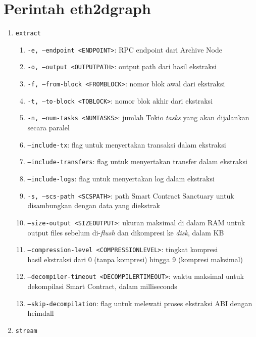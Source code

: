 \chapter{Perintah eth2dgraph}
\label{appendix:eth2dgraph-commands}

\begin{enumerate}
	\item \texttt{extract}
	      \begin{enumerate}
		      \item \texttt{-e, --endpoint <ENDPOINT>}: RPC endpoint dari Archive Node
		      \item \texttt{-o, --output <OUTPUT\textunderscore PATH>}: output path dari hasil ekstraksi
		      \item \texttt{-f, --from-block <FROM\textunderscore BLOCK>}: nomor blok awal dari ekstraksi
		      \item \texttt{-t, --to-block <TO\textunderscore BLOCK>}: nomor blok akhir dari ekstraksi
		      \item \texttt{-n, --num-tasks <NUM\textunderscore TASKS>}: jumlah Tokio \textit{tasks} yang akan dijalankan secara paralel
		      \item \texttt{--include-tx}: flag untuk menyertakan transaksi dalam ekstraksi
		      \item \texttt{--include-transfers}: flag untuk menyertakan transfer dalam ekstraksi
		      \item \texttt{--include-logs}: flag untuk menyertakan log dalam ekstraksi
		      \item \texttt{-s, --scs-path <SCS\textunderscore PATH>}: path Smart Contract Sanctuary untuk disambungkan dengan data yang diekstrak
		      \item \texttt{--size-output <SIZE\textunderscore OUTPUT>}: ukuran maksimal di dalam RAM untuk output files sebelum di-\textit{flush} dan dikompresi ke \textit{disk}, dalam KB
		      \item \texttt{--compression-level <COMPRESSION\textunderscore LEVEL>}: tingkat kompresi \\hasil ekstraksi dari 0 (tanpa kompresi) hingga 9 (kompresi maksimal)
		      \item \texttt{--decompiler-timeout <DECOMPILER\textunderscore TIMEOUT>}: waktu maksimal untuk dekompilasi Smart Contract, dalam milliseconds
		      \item \texttt{--skip-decompilation}: flag untuk melewati proses ekstraksi ABI dengan heimdall
	      \end{enumerate}
	\item \texttt{stream}

\end{enumerate}
